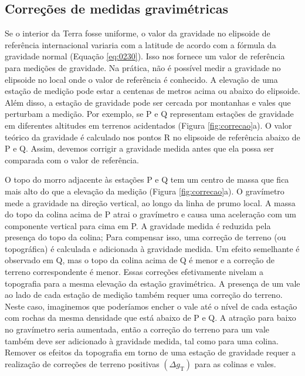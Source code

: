\documentclass[]{book}
\theoremstyle{definition}
\theoremstyle{definition}
\theoremstyle{definition}
\theoremstyle{remark}
\begin{document}
\hypertarget{correcoes-de-medidas-gravimetricas}{%
\subsection{Correções de medidas gravimétricas}\label{correcoes-de-medidas-gravimetricas}}

Se o interior da Terra fosse uniforme, o valor da gravidade no elipsoide de referência internacional variaria com a latitude de acordo com a fórmula da gravidade normal (Equação \eqref{eq:0230}). Isso nos fornece um valor de referência para medições de gravidade. Na prática, não é possível medir a gravidade no elipsoide no local onde o valor de referência é conhecido. A elevação de uma estação de medição pode estar a centenas de metros acima ou abaixo do elipsoide. Além disso, a estação de gravidade pode ser cercada por montanhas e vales que perturbam a medição. Por exemplo, se P e Q representam estações de gravidade em diferentes altitudes em terrenos acidentados (Figura \ref{fig:correcao}a). O valor teórico da gravidade é calculado nos pontos R no elipsoide de referência abaixo de P e Q. Assim, devemos corrigir a gravidade medida antes que ela possa ser comparada com o valor de referência.

O topo do morro adjacente às estações P e Q tem um centro de massa que fica mais alto do que a elevação da medição (Figura \ref{fig:correcao}a). O gravímetro mede a gravidade na direção vertical, ao longo da linha de prumo local. A massa do topo da colina acima de P atrai o gravímetro e causa uma aceleração com um componente vertical para cima em P. A gravidade medida é reduzida pela presença do topo da colina; Para compensar isso, uma correção de terreno (ou topográfica) é calculada e adicionada à gravidade medida. Um efeito semelhante é observado em Q, mas o topo da colina acima de Q é menor e a correção de terreno correspondente é menor. Essas correções efetivamente nivelam a topografia para a mesma elevação da estação gravimétrica. A presença de um vale ao lado de cada estação de medição também requer uma correção do terreno. Neste caso, imaginemos que poderíamos encher o vale até o nível de cada estação com rochas da mesma densidade que está abaixo de P e Q. A atração para baixo no gravímetro seria aumentada, então a correção do terreno para um vale também deve ser adicionado à gravidade medida, tal como para uma colina. Remover os efeitos da topografia em torno de uma estação de gravidade requer a realização de correções de terreno positivas \(\left(\Delta g_{\mathrm{T}}\right)\) para as colinas e vales.
\end{document}
